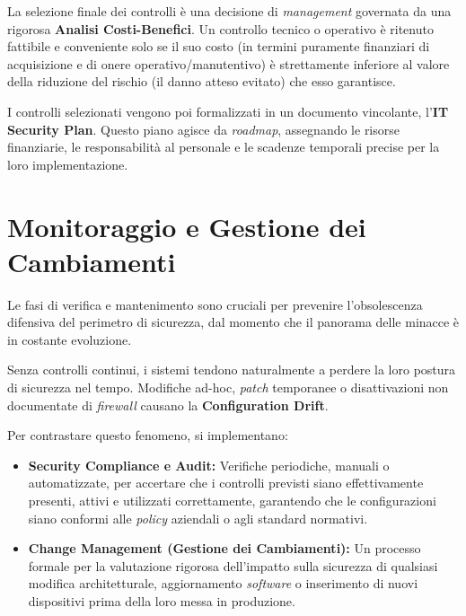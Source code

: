 \begin{notebox}
La selezione finale dei controlli è una decisione di \textit{management} governata da una rigorosa \textbf{Analisi Costi-Benefici}. Un controllo tecnico o operativo è ritenuto fattibile e conveniente solo se il suo costo (in termini puramente finanziari di acquisizione e di onere operativo/manutentivo) è strettamente inferiore al valore della riduzione del rischio (il danno atteso evitato) che esso garantisce.
\end{notebox}

I controlli selezionati vengono poi formalizzati in un documento vincolante, l'\textbf{IT Security Plan}. Questo piano agisce da \textit{roadmap}, assegnando le risorse finanziarie, le responsabilità al personale e le scadenze temporali precise per la loro implementazione.

\section{Monitoraggio e Gestione dei Cambiamenti}
Le fasi di verifica e mantenimento sono cruciali per prevenire l'obsolescenza difensiva del perimetro di sicurezza, dal momento che il panorama delle minacce è in costante evoluzione.

\begin{warnbox}
Senza controlli continui, i sistemi tendono naturalmente a perdere la loro postura di sicurezza nel tempo. Modifiche ad-hoc, \textit{patch} temporanee o disattivazioni non documentate di \textit{firewall} causano la \textbf{Configuration Drift}. 
\end{warnbox}

Per contrastare questo fenomeno, si implementano:
\begin{itemize}
    \item \textbf{Security Compliance e Audit:} Verifiche periodiche, manuali o automatizzate, per accertare che i controlli previsti siano effettivamente presenti, attivi e utilizzati correttamente, garantendo che le configurazioni siano conformi alle \textit{policy} aziendali o agli standard normativi.
    \item \textbf{Change Management (Gestione dei Cambiamenti):} Un processo formale per la valutazione rigorosa dell'impatto sulla sicurezza di qualsiasi modifica architetturale, aggiornamento \textit{software} o inserimento di nuovi dispositivi prima della loro messa in produzione.
\end{itemize}